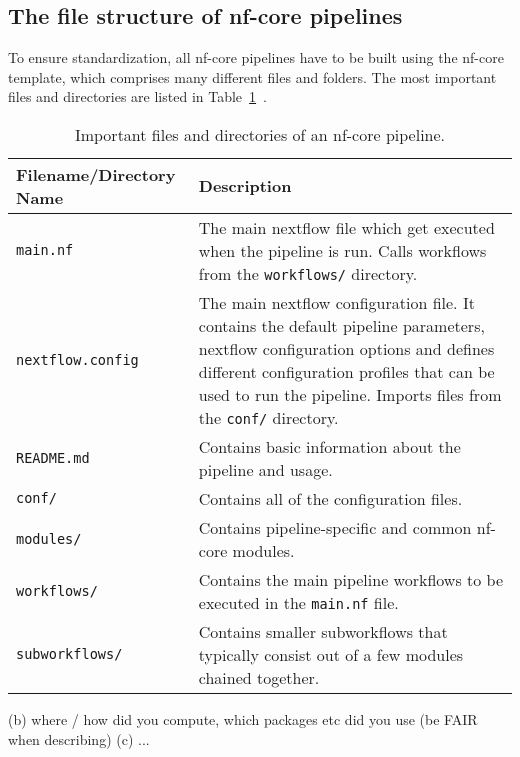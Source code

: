 \documentclass{article}
\theoremstyle{plain}
\theoremstyle{definition}
\theoremstyle{remark}
\begin{document}
\subsection{The file structure of nf-core pipelines}
To ensure standardization, all nf-core pipelines have to be built using the nf-core template, which comprises many different files and folders. The most important files and directories are listed in Table~\ref{nfcorefiles}~\cite{nfcorefs}.
\begin{table}[h]
    \centering
    \caption{Important files and directories of an nf-core pipeline.}
    \begin{tabular}{@{}lp{12cm}@{}}
        \toprule
        \textbf{Filename/Directory Name} & \textbf{Description} \\ \midrule
        \verb|main.nf| & The main nextflow file which get executed when the pipeline is run. Calls workflows from the \verb|workflows/| directory. \\
        \verb|nextflow.config| & The main nextflow configuration file. It contains the default pipeline parameters, nextflow configuration options and defines different configuration profiles that can be used to run the pipeline. Imports files from the \verb|conf/| directory. \\
        \verb|README.md| & Contains basic information about the pipeline and usage. \\
        \verb|conf/| & Contains all of the configuration files. \\
        \verb|modules/| & Contains pipeline-specific and common nf-core modules. \\
        \verb|workflows/| & Contains the main pipeline workflows to be executed in the \verb|main.nf| file. \\
        \verb|subworkflows/| & Contains smaller subworkflows that typically consist out of a few modules chained together. \\ \bottomrule
    \end{tabular}
    \label{nfcorefiles}
\end{table}
(b) where / how did you compute, which packages etc did you use (be FAIR when describing)
(c) ...
\end{document}
